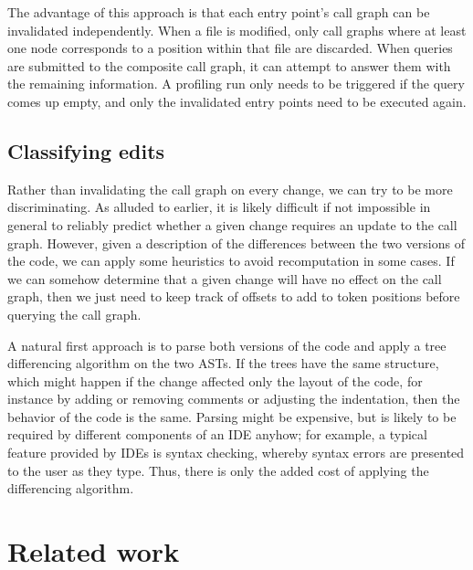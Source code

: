 The advantage of this approach is that each entry point's call graph can be
invalidated independently. When a file is modified, only call graphs where at
least one node corresponds to a position within that file are discarded. When
queries are submitted to the composite call graph, it can attempt to answer
them with the remaining information. A profiling run only needs to be triggered
if the query comes up empty, and only the invalidated entry points need to be
executed again.


\subsection{Classifying edits}

Rather than invalidating the call graph on every change, we can try to be more
discriminating. As alluded to earlier, it is likely difficult if not impossible
in general to reliably predict whether a given change requires an update to the
call graph. However, given a description of the differences between the two
versions of the code, we can apply some heuristics to avoid recomputation in
some cases. If we can somehow determine that a given change will have no effect
on the call graph, then we just need to keep track of offsets to add to token
positions before querying the call graph.

A natural first approach is to parse both versions of the code and apply a tree
differencing algorithm on the two ASTs. If the trees have the same structure,
which might happen if the change affected only the layout of the code, for
instance by adding or removing comments or adjusting the indentation, then the
behavior of the code is the same. Parsing might be expensive, but is likely to
be required by different components of an IDE anyhow; for example, a typical
feature provided by IDEs is syntax checking, whereby syntax errors are
presented to the user as they type. Thus, there is only the added cost of
applying the differencing algorithm.


\section{Related work}



